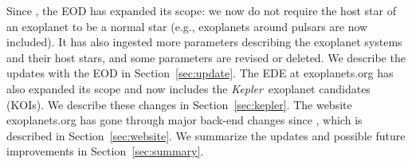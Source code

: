 \documentclass[11pt,preprint]{aastex}
\def\kepler{\textit{Kepler}}
\begin{document}
\begin{CJK*}{UTF8}{gbsn}
Since \cite{Wright2011}, the EOD has expanded its scope: we now do
not require the host star of an exoplanet to be a normal star (e.g.,
exoplanets around pulsars are now included). It has also ingested more
parameters describing the exoplanet systems and their host stars, and some
parameters are revised or deleted. We describe the updates with the
EOD in Section~\ref{sec:update}. The EDE at exoplanets.org has also
expanded its scope and now includes the \kepler\ exoplanet candidates
(KOIs). We describe these changes in Section~\ref{sec:kepler}. The
website exoplanets.org has gone through major back-end changes since
\cite{Wright2011}, which is described in Section~\ref{sec:website}. We
summarize the updates and possible future improvements in
Section~\ref{sec:summary}. 

\end{CJK*}
\end{document}
